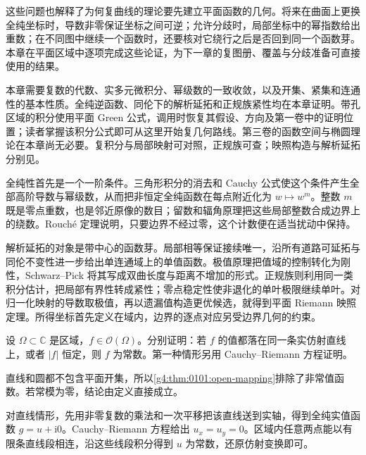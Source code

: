 \ProseParagraphBreak

这些问题也解释了为何复曲线的理论要先建立平面函数的几何。将来在曲面上更换全纯坐标时，导数非零保证坐标之间可逆；允许分歧时，局部坐标中的幂指数给出重数；在不同图中继续一个函数时，还要核对它绕行之后是否回到同一个函数芽。本章在平面区域中逐项完成这些论证，为下一章的复图册、覆盖与分歧准备可直接使用的结果。

\ProseParagraphBreak

本章需要复数的代数、实多元微积分、幂级数的一致收敛，以及开集、紧集和连通性的基本性质。全纯逆函数、同伦下的解析延拓和正规族紧性均在本章证明。带孔区域的积分使用平面 Green 公式，调用时恢复其假设、方向及第一卷中的证明位置；读者掌握该积分公式即可从这里开始复几何路线。第三卷的函数空间与椭圆理论在本章尚无必要。复积分与局部映射可对照\cite[第4章第2--3节]{Ahlfors1979Complex}，正规族可查\cite[第5章第5.3--5.4节]{Ahlfors1979Complex}；映照构造与解析延拓分别见\cite[第6章第1.1节; 第8章第1.4--1.6节]{Ahlfors1979Complex}。






\begin{chaptersummary}
	全纯性首先是一个一阶条件。三角形积分的消去和 Cauchy 公式使这个条件产生全部高阶导数与幂级数，从而把非恒定全纯函数在每点附近化为 \(w\mapsto w^m\)。整数 \(m\) 既是零点重数，也是邻近原像的数目；留数和辐角原理把这些局部整数合成边界上的绕数。Rouché 定理说明，只要边界不经过零，这个计数便在适当扰动中保持。

	\ProseParagraphBreak

	解析延拓的对象是带中心的函数芽。局部相等保证接续唯一，沿所有道路可延拓与同伦不变性进一步给出单连通域上的单值函数。极值原理把值域的控制转化为刚性，Schwarz--Pick 将其写成双曲长度与距离不增加的形式。正规族则利用同一类积分估计，把局部有界性转成紧性；零点稳定性使非退化的单叶极限继续单叶。对归一化映射的导数取极值，再以遗漏值构造更优候选，就得到平面 Riemann 映照定理。所得坐标首先定义在域内，边界的逐点对应另受边界几何的约束。
\end{chaptersummary}

\BookExercises

\begin{exercise}
	\label{g4:ex:0101:rigid-images}
	设 \(\Omega\subset\mathbb C\) 是区域，\(f\in\mathcal O(\Omega)\)。分别证明：若 \(f\) 的值都落在同一条实仿射直线上，或者 \(|f|\) 恒定，则 \(f\) 为常数。第一种情形另用 Cauchy--Riemann 方程证明。
\end{exercise}
\begin{solution}
	直线和圆都不包含平面开集，所以\cref{g4:thm:0101:open-mapping}排除了非常值函数。若常模为零，结论由定义直接成立。

	对直线情形，先用非零复数的乘法和一次平移把该直线送到实轴，得到全纯实值函数 \(g=u+\mathrm i0\)。Cauchy--Riemann 方程给出 \(u_x=u_y=0\)。区域内任意两点能以有限条直线段相连，沿这些线段积分得到 \(u\) 为常数，还原仿射变换即可。
\end{solution}

